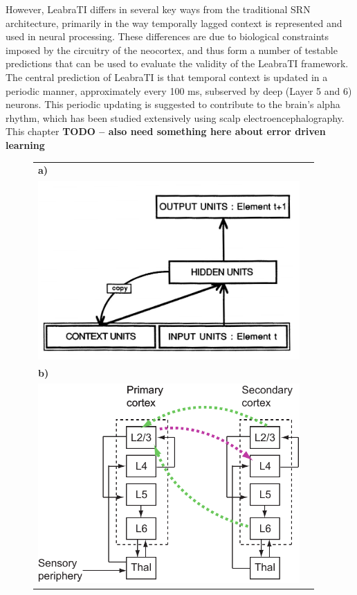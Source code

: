 \documentclass[dwyatte_dissertation.tex]{subfiles}
\begin{document}
However, LeabraTI differs in several key ways from the traditional SRN architecture, primarily in the way temporally lagged context is represented and used in neural processing. These differences are due to biological constraints imposed by the circuitry of the neocortex, and thus form a number of testable predictions that can be used to evaluate the validity of the LeabraTI framework. The central prediction of LeabraTI is that temporal context is updated in a periodic manner, approximately every 100 ms, subserved by deep (Layer 5 and 6) neurons. This periodic updating is suggested to contribute to the brain's alpha rhythm, which has been studied extensively using scalp electroencephalography. This chapter \textbf{TODO -- also need something here about error driven learning}

\begin{figure}[hp]
\centering
\begin{tabular}{ll}
\textbf{a)} \\
\includegraphics[width=100mm]{figs/leabrati/srn_scm.png} \\
\textbf{b)} \\
\includegraphics[width=100mm]{figs/leabrati/microcircuit_horiz.pdf} \\

\end{tabular}
\end{figure}
\end{document}
